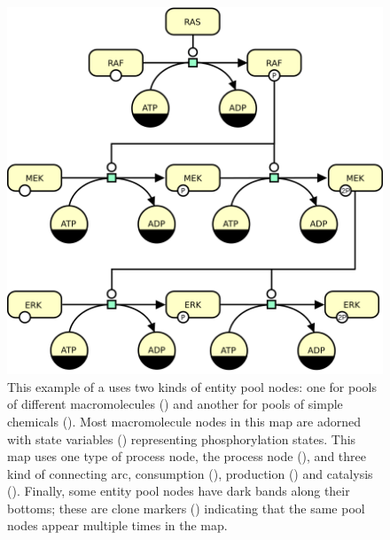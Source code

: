 \begin{figure}[htb]
  \centering
  \vspace*{-0.75em}
  \includegraphics[scale=0.8]{images/MAPK-only}
  \caption{This example of a \PD uses two kinds of entity pool nodes: one for pools of different macromolecules () and another for pools of simple chemicals (). Most macromolecule nodes in this map are adorned with state variables () representing phosphorylation states. This map uses one type of process node, the process node (), and three kind of connecting arc, consumption (), production () and catalysis ().  Finally, some entity pool nodes have dark bands along their bottoms; these are clone markers () indicating that the same pool nodes appear multiple times in the map.}
  \label{fig:eg1}
\end{figure}

